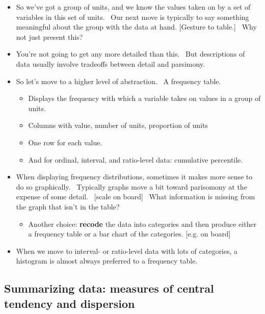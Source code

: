 \documentclass[11pt]{article}
\begin{document}
\begin{itemize}
\item So we've got a group of units, and we know the values taken on by a
set of variables in this set of units. \ Our next move is typically to say
something meaningful about the group with the data at hand. [Gesture to
table.] \ Why not just present this? \ 

\item You're not going to get any more detailed than this. \ But
descriptions of data usually involve tradeoffs between detail and parsimony.

\item So let's move to a higher level of abstraction. \ A frequency table.

\begin{itemize}
\item Displays the frequency with which a variable takes on values in a
group of units.

\item Columns with value, number of units, proportion of units

\item One row for each value.

\item And for ordinal, interval, and ratio-level data: cumulative percentile.
\end{itemize}

\item When displaying frequency distributions, sometimes it makes more sense
to do so graphically. \ Typically graphs move a bit toward parisomony at the
expense of some detail. \ [scale on board] \ What information is missing
from the graph that isn't in the table?

\begin{itemize}
\item Another choice: \textbf{recode} the data into categories and then
produce either a frequency table or a bar chart of the categories. [e.g. on
board]
\end{itemize}

\item When we move to interval- or ratio-level data with lots of categories,
a histogram is almost always preferred to a frequency table.
\end{itemize}

\subsection{Summarizing data: measures of central tendency and dispersion}
\end{document}
